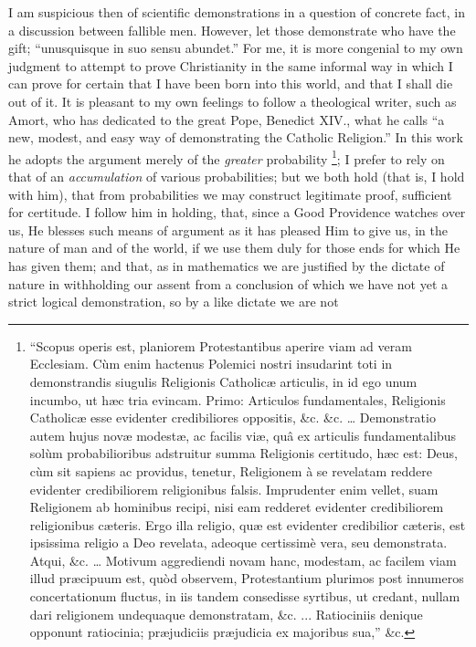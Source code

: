 I am suspicious then of scientific demonstrations in a question of concrete fact, in a discussion between fallible men.
However, let those demonstrate who have the gift; ``unusquisque in
suo sensu abundet.'' For me, it is more congenial to my own
judgment to attempt to prove Christianity in the same informal way in
which I can prove for certain that I have been born into this world,
and that I shall die out of it. It is pleasant to my own feelings to
follow a theological writer, such as Amort, who has dedicated to the
great Pope, Benedict XIV., what he calls ``a new, modest, and easy
way of demonstrating the Catholic Religion.'' In this work he
adopts the argument merely of the \emph{greater} probability \footnote{``Scopus operis est, planiorem Protestantibus aperire viam
ad veram Ecclesiam. Cùm enim hactenus Polemici nostri insudarint toti
in demonstrandis siugulis Religionis Catholicæ articulis, in id ego
unum incumbo, ut hæc tria evincam. Primo: Articulos fundamentales,
Religionis Catholicæ esse evidenter credibiliores oppositis, \&c.
\&c. … Demonstratio autem hujus novæ modestæ, ac facilis viæ,
quâ ex articulis fundamentalibus solùm probabilioribus adstruitur
summa Religionis certitudo, hæc est: Deus, cùm sit sapiens ac
providus, tenetur, Religionem à se revelatam reddere evidenter
credibiliorem religionibus falsis. Imprudenter enim vellet, suam
Religionem ab hominibus recipi, nisi eam redderet evidenter
credibiliorem religionibus cæteris. Ergo illa religio, quæ est
evidenter credibilior cæteris, est ipsissima religio a Deo revelata,
adeoque certissimè vera, seu demonstrata. Atqui, \&c. … Motivum
aggrediendi novam hanc, modestam, ac facilem viam illud præcipuum est,
quòd observem, Protestantium plurimos post innumeros concertationum
fluctus, in iis tandem consedisse syrtibus, ut credant, nullam dari
religionem undequaque demonstratam, \&c. ... Ratiociniis denique
opponunt ratiocinia; præjudiciis præjudicia ex majoribus sua,''
\&c.}; I prefer to rely on that of an \emph{accumulation} of various
probabilities; but we both hold (that is, I hold with him), that from
probabilities we may construct legitimate proof, sufficient for
certitude. I follow him in holding, that, since a Good Providence watches over us, He blesses such means of argument as it
has pleased Him to give us, in the nature of man and of the world, if
we use them duly for those ends for which He has given them; and that,
as in mathematics we are justified by the dictate of nature in
withholding our assent from a conclusion of which we have not yet a
strict logical demonstration, so by a like dictate we are not
